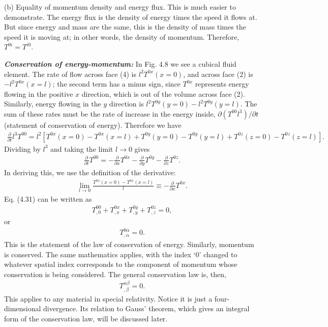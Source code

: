 \documentclass[12pt]{book}
\begin{document}
    (b) Equality of momentum density and energy flux. This is much easier to demonstrate. The energy flux is the density of energy times the speed it flows at. But since energy and mass are the same, this is the density of mass times the speed it is moving at; in other words, the density of momentum. Therefore, \(T^{0i} = T^{i0}\).

    \textbf{\textit{Conservation of energy-momentum:}}
    In Fig. 4.8 we see a cubical fluid element. The rate of flow across face (4) is \(l^2 T^{0x}(x = 0)\), and across face (2) is \(-l^2 T^{0x}(x = l)\); the second term has a minus sign, since \(T^{0x}\) represents energy flowing in the positive \(x\) direction, which is out of the volume across face (2). Similarly, energy flowing in the \(y\) direction is \(l^2 T^{0y}(y = 0) - l^2 T^{0y}(y = l)\). The sum of these rates must be the rate of increase in the energy inside, \(\partial(T^{00} l^3)/\partial t\) (statement of conservation of energy). Therefore we have
    \begin{align}
    \frac{\partial}{\partial t} l^3 T^{00} = l^2 \left[ T^{0x}(x = 0) - T^{0x}(x = l) + T^{0y}(y = 0) - T^{0y}(y = l) + T^{0z}(z = 0) - T^{0z}(z = l) \right]. \tag{4.30}
    \end{align}
    Dividing by \(l^3\) and taking the limit \(l \to 0\) gives
    \begin{align}
    \frac{\partial}{\partial t} T^{00} = - \frac{\partial}{\partial x} T^{0x} - \frac{\partial}{\partial y} T^{0y} - \frac{\partial}{\partial z} T^{0z}. \tag{4.31}
    \end{align}
    In deriving this, we use the definition of the derivative:
    \begin{align}
    \lim_{l \to 0} \frac{T^{0x}(x = 0) - T^{0x}(x = l)}{l} \equiv - \frac{\partial}{\partial x} T^{0x}. \tag{4.32}
    \end{align}
    Eq. (4.31) can be written as
    \begin{align}
    T^{00}_{,0} + T^{0x}_{,x} + T^{0y}_{,y} + T^{0z}_{,z} = 0,
    \end{align}
    or
    \begin{align}
    T^{0\alpha}_{,\alpha} = 0. \tag{4.33}
    \end{align}
    This is the statement of the law of conservation of energy. Similarly, momentum is conserved. The same mathematics applies, with the index ‘0’ changed to whatever spatial index corresponds to the component of momentum whose conservation is being considered. The general conservation law is, then,
    \begin{align}
    T^{\alpha\beta}_{,\beta} = 0. \tag{4.34}
    \end{align}
    This applies to any material in special relativity. Notice it is just a four-dimensional divergence. Its relation to Gauss’ theorem, which gives an integral form of the conservation law, will be discussed later.
\end{document}
